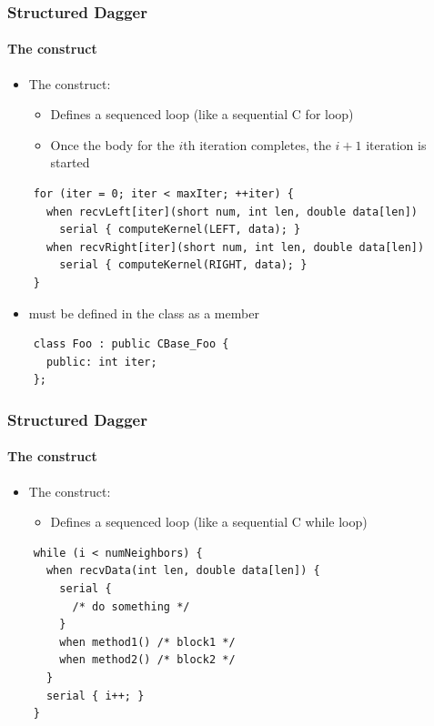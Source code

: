 \begin{frame}[fragile]
  \frametitle{Structured Dagger}
  \framesubtitle{The  construct}
  \begin{itemize}
  \item The  construct:
    \begin{itemize}
    \item Defines a sequenced  loop (like a sequential C for loop)
    \item Once the body for the $i$th iteration completes, the $i+1$ iteration
      is started
    \end{itemize}
  \end{itemize}
  \begin{lstlisting}
    for (iter = 0; iter < maxIter; ++iter) {
      when recvLeft[iter](short num, int len, double data[len])
        serial { computeKernel(LEFT, data); }
      when recvRight[iter](short num, int len, double data[len])
        serial { computeKernel(RIGHT, data); }
    }
  \end{lstlisting}
  \begin{itemize}
  \item {} must be defined in the class as a member
  \end{itemize}
  \begin{lstlisting}
    class Foo : public CBase_Foo {
      public: int iter;
    };
  \end{lstlisting}
\end{frame}

\begin{frame}[fragile]
  \frametitle{Structured Dagger}
  \framesubtitle{The  construct}
  \begin{itemize}
  \item The  construct:
    \begin{itemize}
    \item Defines a sequenced  loop (like a sequential C while loop)
    \end{itemize}
  \end{itemize}
  \begin{lstlisting}
    while (i < numNeighbors) {
      when recvData(int len, double data[len]) {
        serial {
          /* do something */
        }
        when method1() /* block1 */
        when method2() /* block2 */
      }
      serial { i++; }
    }
  \end{lstlisting}
\end{frame}

